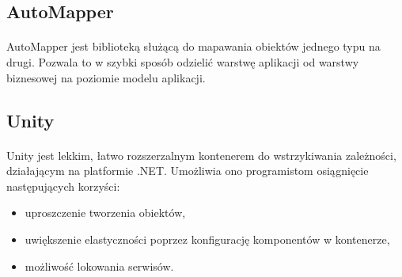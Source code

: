 \subsection{AutoMapper} %
\label{sub:automapper}
\paragraph{} %
\label{par:}

AutoMapper jest biblioteką służącą do mapawania obiektów jednego typu na drugi. Pozwala to w szybki sposób odzielić warstwę aplikacji od warstwy biznesowej na poziomie modelu aplikacji.

\subsection{Unity} %
\label{sub:unity}
\paragraph{} %
\label{par:paragraph_name}
Unity jest lekkim, łatwo rozszerzalnym kontenerem do wstrzykiwania zależności, działającym na platformie .NET. Umożliwia ono programistom osiągnięcie następujących korzyści:
\begin{itemize}
\item uproszczenie tworzenia obiektów,
\item uwiększenie elastyczności poprzez konfigurację komponentów w kontenerze,
\item możliwość lokowania serwisów.
\end{itemize}
